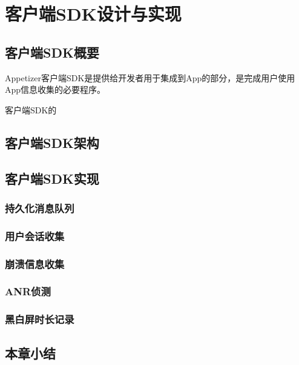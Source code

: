 
\chapter{客户端SDK设计与实现}
\label{chap:client}

\section{客户端SDK概要}

Appetizer客户端SDK是提供给开发者用于集成到App的部分，是完成用户使用App信息收集的必要程序。



客户端SDK的


\section{客户端SDK架构}


\section{客户端SDK实现}


\subsection{持久化消息队列}

\subsection{用户会话收集}

\subsection{崩溃信息收集}

\subsection{ANR侦测}

\subsection{黑白屏时长记录}



\section{本章小结}
